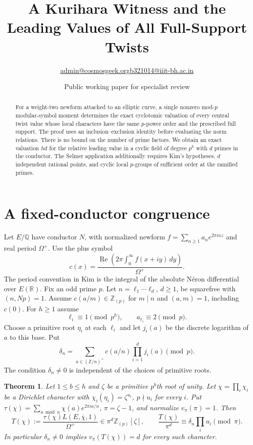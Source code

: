 \documentclass[11pt]{article}
\title{A Kurihara Witness and the Leading Values of All Full-Support Twists}
\author{\small \href{mailto:admin@cosmosgeek.org}{admin@cosmosgeek.org}\qquad \href{mailto:b321014@iiit-bh.ac.in}{b321014@iiit-bh.ac.in}}
\date{Public working paper for specialist review}
\newtheorem{theorem}{Theorem}
\newcommand{\Q}{\mathbb Q}
\newcommand{\Z}{\mathbb Z}
\begin{document}
\maketitle
\begin{abstract}
For a weight-two newform attached to an elliptic curve, a single nonzero
mod-$p$ modular-symbol moment determines the exact cyclotomic valuation
of every central twist value whose local characters have the same
$p$-power order and the prescribed full support. The proof uses an
inclusion--exclusion identity before evaluating the norm relations.
There is no bound on the number of prime factors. We obtain an exact
valuation $hd$ for the relative leading value in a cyclic field of degree
$p^h$ with $d$ primes in the conductor. The Selmer application additionally
requires Kim's hypotheses, $d$ independent rational points, and cyclic
local $p$-groups of sufficient order at the ramified primes.
\end{abstract}

\section{A fixed-conductor congruence}
Let $E/\Q$ have conductor $N$, with normalized newform
$f=\sum_{n\ge1}a_n e^{2\pi inz}$ and real period $\Omega^+$.
Use the plus symbol
\[
 c(x)=\frac{\operatorname{Re}\left(2\pi\int_0^\infty f(x+iy)\,dy\right)}{\Omega^+}.
\]
The period convention in Kim \cite[\S1.4]{Kim} is the integral of the
absolute N\'eron differential over $E(\mathbb R)$.
Fix an odd prime $p$. Let $n=\ell_1\cdots\ell_d$, $d\ge1$, be
squarefree with $(n,Np)=1$. Assume $c(a/m)\in\Z_{(p)}$ for
$m\mid n$ and $(a,m)=1$, including $c(0)$.
For $h\ge1$ assume
\[
 \ell_i\equiv1\pmod{p^h},\qquad a_{\ell_i}\equiv2\pmod p .
 \tag{1}
\]
Choose a primitive root $\eta_i$ at each $\ell_i$ and let $j_i(a)$
be the discrete logarithm of $a$ to this base. Put
\[
 \delta_n=\sum_{a\in(\Z/n)^\times}c(a/n)
         \prod_{i=1}^d j_i(a)\pmod p.
\]
The condition $\delta_n\ne0$ is independent of the choices of
primitive roots.

\begin{theorem}\label{main}
Let $1\le b\le h$ and $\zeta$ be a primitive $p^b$th root of unity.
Let $\chi=\prod_i\chi_i$ be a Dirichlet character with
$\chi_i(\eta_i)=\zeta^{u_i}$, $p\nmid u_i$ for every $i$.
Put $\tau(\chi)=\sum_{a\bmod n}\chi(a)e^{2\pi ia/n}$,
$\pi=\zeta-1$, and normalize $v_\pi(\pi)=1$. Then
\[
 T(\chi):=\frac{\tau(\chi)L(E,\overline\chi,1)}{\Omega^+}
 \in\pi^d\Z_{(p)}[\zeta],\qquad
 \frac{T(\chi)}{\pi^d}\equiv\delta_n\prod_i u_i\pmod\pi .
 \tag{2}
\]
In particular $\delta_n\ne0$ implies $v_\pi(T(\chi))=d$ for every such
character.
\end{theorem}
\end{document}
